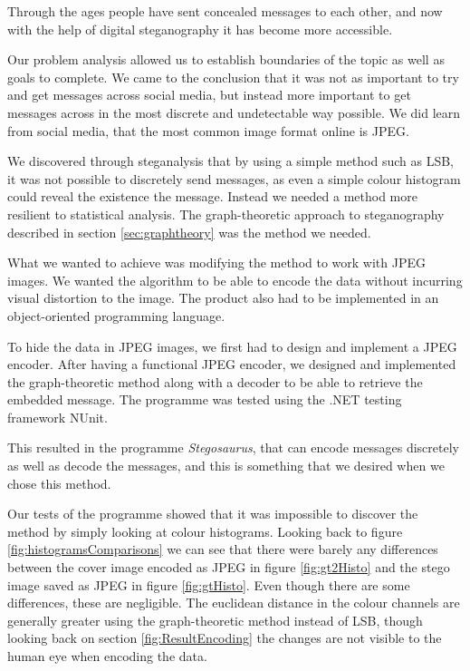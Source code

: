 Through the ages people have sent concealed messages to each other, and now with the help of digital steganography it has become more accessible.

Our problem analysis allowed us to establish  boundaries of the topic as well as goals to complete.
We came to the conclusion that it was not as important to try and get messages across social media, but instead more important to get messages across in the most discrete and undetectable way possible.
We did learn from social media, that the most common image format online is JPEG. 

We discovered through steganalysis that by using a simple method such as LSB, it was not possible to discretely send messages, as even a simple colour histogram could reveal the existence the message.
Instead we needed a method more resilient to statistical analysis.
The graph-theoretic approach to steganography described in section \ref{sec:graphtheory} was the method we needed.

What we wanted to achieve was modifying the method to work with JPEG images.
We wanted the algorithm to be able to encode the data without incurring visual distortion to the image.
The product also had to be implemented in an object-oriented programming language.

To hide the data in JPEG images, we first had to design and implement a JPEG encoder.
After having a functional JPEG encoder, we designed and implemented the graph-theoretic method along with a decoder to be able to retrieve the embedded message.
The programme was tested using the .NET testing framework NUnit. 

This resulted in the programme \textit{Stegosaurus}, that can encode messages discretely as well as decode the messages, and this is something that we desired when we chose this method. 

Our tests of the programme showed that it was impossible to discover the method by simply looking at colour histograms.
Looking back to figure \ref{fig:histogramsComparisons} we can see that there were barely any differences between the cover image encoded as JPEG in figure \ref{fig:gt2Histo} and the stego image saved as JPEG in figure \ref{fig:gtHisto}.
Even though there are some differences, these are negligible.
The euclidean distance in the colour channels are generally greater using the graph-theoretic method instead of LSB, though looking back on section \ref{fig:ResultEncoding} the changes are not visible to the human eye when encoding the data.

